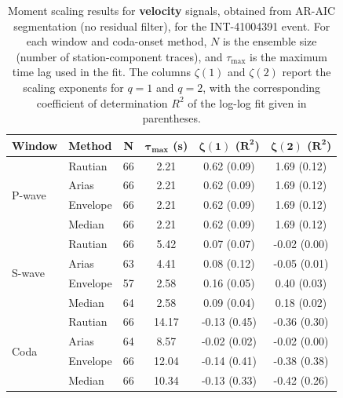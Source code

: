 \begin{table}[H]
\centering
\small
\begin{tabular}{llcccc}
\toprule
\textbf{Window} & \textbf{Method} & \textbf{N} & $\bm{\tau_{\max}}$ \textbf{(s)} & $\bm{\zeta(1)}$ \textbf{(}$\bm{R^2}$\textbf{)} & $\bm{\zeta(2)}$ \textbf{(}$\bm{R^2}$\textbf{)} \\
\midrule
\multirow{4}{*}{P-wave}
& Rautian & 66 & 2.21 & 0.62 (0.09) & 1.69 (0.12) \\
& Arias & 66 & 2.21 & 0.62 (0.09) & 1.69 (0.12) \\
& Envelope & 66 & 2.21 & 0.62 (0.09) & 1.69 (0.12) \\
& Median & 66 & 2.21 & 0.62 (0.09) & 1.69 (0.12) \\
\midrule
\multirow{4}{*}{S-wave}
& Rautian & 66 & 5.42 & 0.07 (0.07) & -0.02 (0.00) \\
& Arias & 63 & 4.41 & 0.08 (0.12) & -0.05 (0.01) \\
& Envelope & 57 & 2.58 & 0.16 (0.05) & 0.40 (0.03) \\
& Median & 64 & 2.58 & 0.09 (0.04) & 0.18 (0.02) \\
\midrule
\multirow{4}{*}{Coda}
& Rautian & 66 & 14.17 & -0.13 (0.45) & -0.36 (0.30) \\
& Arias & 64 & 8.57 & -0.02 (0.02) & -0.02 (0.00) \\
& Envelope & 66 & 12.04 & -0.14 (0.41) & -0.38 (0.38) \\
& Median & 66 & 10.34 & -0.13 (0.33) & -0.42 (0.26) \\
\bottomrule
\end{tabular}
\caption{Moment scaling results for \textbf{velocity} signals, obtained from AR-AIC segmentation (no residual filter), for the INT-41004391 event. For each window and coda-onset method, $N$ is the ensemble size (number of station-component traces), and $\tau_{\max}$ is the maximum time lag used in the fit. The columns $\zeta(1)$ and $\zeta(2)$ report the scaling exponents for $q=1$ and $q=2$, with the corresponding coefficient of determination $R^2$ of the log-log fit given in parentheses.}
\label{tab:ar_aic_scaling_vel_nothresh_queyras}
\end{table}